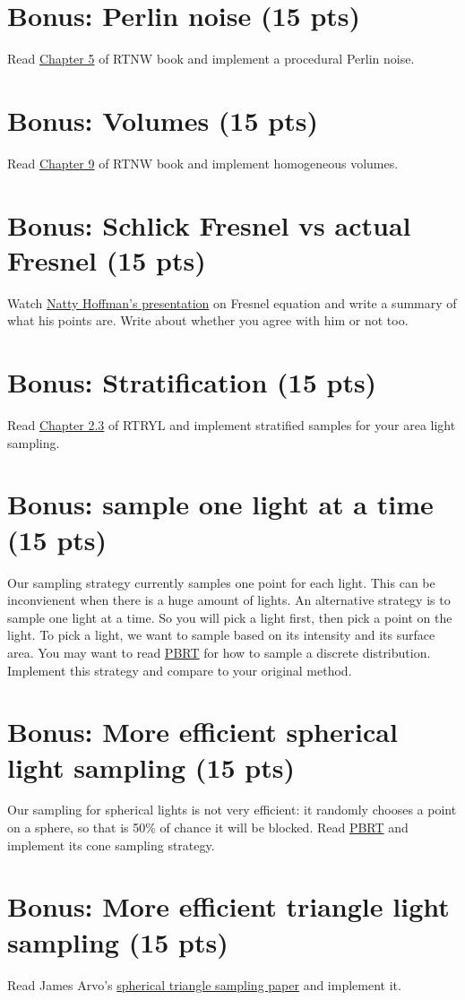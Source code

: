 \section{Bonus: Perlin noise (15 pts)}
Read \href{https://raytracing.github.io/books/RayTracingTheNextWeek.html#perlinnoise}{Chapter 5} of RTNW book and implement a procedural Perlin noise.

\section{Bonus: Volumes (15 pts)}
Read \href{https://raytracing.github.io/books/RayTracingTheNextWeek.html#volumes}{Chapter 9} of RTNW book and implement homogeneous volumes.

\section{Bonus: Schlick Fresnel vs actual Fresnel (15 pts)}
Watch \href{https://www.youtube.com/watch?v=kEcDbl7eS0w}{Natty Hoffman's presentation} on Fresnel equation and write a summary of what his points are. Write about whether you agree with him or not too.

\section{Bonus: Stratification (15 pts)}
Read \href{https://raytracing.github.io/books/RayTracingTheRestOfYourLife.html#asimplemontecarloprogram/stratifiedsamples(jittering)}{Chapter 2.3} of RTRYL and implement stratified samples for your area light sampling.

\section{Bonus: sample one light at a time (15 pts)}
Our sampling strategy currently samples one point for each light. This can be inconvienent when there is a huge amount of lights. An alternative strategy is to sample one light at a time. So you will pick a light first, then pick a point on the light. To pick a light, we want to sample based on its intensity and its surface area. You may want to read \href{https://www.pbr-book.org/3ed-2018/Monte_Carlo_Integration/Sampling_Random_Variables#x1-Example:Piecewise-Constant1DFunctions}{PBRT} for how to sample a discrete distribution. Implement this strategy and compare to your original method.

\section{Bonus: More efficient spherical light sampling (15 pts)}
Our sampling for spherical lights is not very efficient: it randomly chooses a point on a sphere, so that is 50\% of chance it will be blocked. Read \href{https://www.pbr-book.org/3ed-2018/Light_Transport_I_Surface_Reflection/Sampling_Light_Sources#x2-SamplingSpheres}{PBRT} and implement its cone sampling strategy.

\section{Bonus: More efficient triangle light sampling (15 pts)}
Read James Arvo's \href{https://dl.acm.org/doi/pdf/10.1145/218380.218500}{spherical triangle sampling paper} and implement it.

%
%


